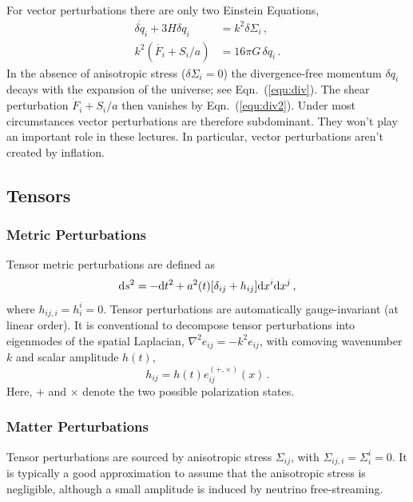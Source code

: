 \documentclass[12pt,letterpaper,rotate]{article}
\def\beq{\begin{equation}}
\def\eeq{\end{equation}}
\def\d{{\rm d}}
\begin{document}
{For vector perturbations there are only two Einstein Equations, 
\begin{align}
\dot{\delta q_i} + 3 H \delta q_i &= k^2 \delta \Sigma_i\, , \label{equ:div}  \\
k^2 (\dot {F_i} + S_i/a) & = 16 \pi G \, \delta q_i\, . \label{equ:div2}
\end{align}
In the absence of anisotropic stress ($\delta \Sigma_i = 0$) the divergence-free momentum $\delta q_i$ decays with the expansion of the universe; see Eqn.~(\ref{equ:div}).
The shear perturbation $\dot F_i + S_i/a$ then vanishes by Eqn.~(\ref{equ:div2}).
Under most circumstances vector perturbations are therefore subdominant.
They won't play an important role in these lectures.
In particular, vector perturbations aren't created by inflation.

\subsection{Tensors}


\subsubsection{Metric Perturbations}

Tensor metric perturbations are defined as
\beq
\label{equ:Tmetric}
\d s^2 = - \d t^2 + a^2(t)[\delta_{ij} +  h_{ ij}] \d x^i \d x^j\, ,
\eeq
where $h_{ij, i} = h^{i}_i = 0$.
Tensor perturbations are automatically gauge-invariant (at linear order).
It is conventional to decompose tensor perturbations into eigenmodes of the spatial Laplacian, $\nabla^2 e_{ij} = - k^2 e_{ij}$, with comoving wavenumber $k$ and scalar amplitude $h(t)$,
\beq
h_{ij} = h(t) e_{ij}^{(+,\times)}(x)\, .
\eeq
Here, $+$ and $\times$ denote the two possible polarization states.



\subsubsection{Matter Perturbations}

Tensor perturbations are sourced by 
anisotropic stress $\Sigma_{ij}$, with $\Sigma_{ij,i} = \Sigma^i_i =0$.
It is typically a good approximation to assume that the anisotropic stress is negligible, although a small amplitude is induced by neutrino free-streaming.

}
\end{document}
